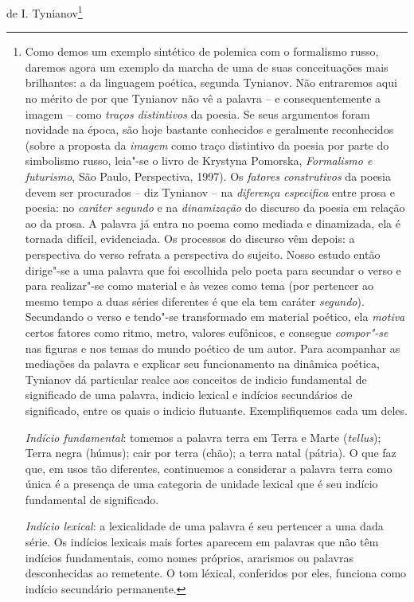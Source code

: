 de I. Tynianov\footnote{Como demos um exemplo sintético de polemica com
  o formalismo russo, daremos agora um exemplo da marcha de uma de suas
  conceituações mais brilhantes: a da linguagem poética, segunda
  Tynianov. Não entraremos aqui no mérito de por que Tynianov não vê a
  palavra -- e consequentemente a imagem -- como \emph{traços
  distintivos} da poesia. Se seus argumentos foram novidade na época,
  são hoje bastante conhecidos e geralmente reconhecidos (sobre a
  proposta da \emph{imagem} como traço distintivo da poesia por parte do
  simbolismo russo, leia"-se o livro de Krystyna Pomorska,
  \emph{Formalismo e futurismo}, São Paulo, Perspectiva, 1997). Os
  \emph{fatores construtivos} da poesia devem ser procurados -- diz
  Tynianov -- na \emph{diferença especifica} entre prosa e poesia: no
  \emph{caráter segundo} e na \emph{dinamização} do discurso da poesia
  em relação ao da prosa. A palavra já entra no poema como mediada e
  dinamizada, ela é tornada difícil, evidenciada. Os processos do
  discurso vêm depois: a perspectiva do verso refrata a perspectiva do
  sujeito. Nosso estudo então dirige"-se a uma palavra que foi escolhida
  pelo poeta para secundar o verso e para realizar"-se como material e às
  vezes como tema (por pertencer ao mesmo tempo a duas séries diferentes
  é que ela tem caráter \emph{segundo}). Secundando o verso e tendo"-se
  transformado em material poético, ela \emph{motiva} certos fatores
  como ritmo, metro, valores eufônicos, e consegue \emph{compor"-se} nas
  figuras e nos temas do mundo poético de um autor. Para acompanhar as
  mediações da palavra e explicar seu funcionamento na dinâmica poética,
  Tynianov dá particular realce aos conceitos de indicio fundamental de
  significado de uma palavra, indicio lexical e indícios secundários de
  significado, entre os quais o indicio flutuante. Exemplifiquemos cada
  um deles.

  \emph{Indício fundamental}: tomemos a palavra terra em Terra e Marte
  (\emph{tellus}); Terra negra (húmus); cair por terra (chão); a terra
  natal (pátria). O que faz que, em usos tão diferentes, continuemos a
  considerar a palavra terra como única é a presença de uma categoria de
  unidade lexical que é seu indício fundamental de significado.

  \emph{Indício lexical}: a lexicalidade de uma palavra é seu pertencer
  a uma dada série. Os indícios lexicais mais fortes aparecem em
  palavras que não têm indícios fundamentais, como nomes próprios,
  ararismos ou palavras desconhecidas ao remetente. O tom léxical,
  conferidos por eles, funciona como indício secundário permanente.

}
